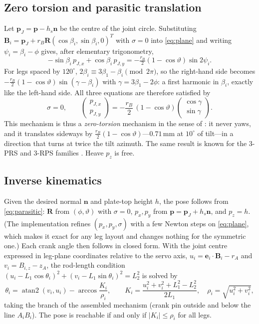 \documentclass[10pt,a4paper]{article}
\newcommand{\un}[1]{\,\mathrm{#1}}
\newcommand{\vect}[1]{\bm{#1}}
\newcommand{\hatn}{\vect{n}}
\begin{document}
\subsection{Zero torsion and parasitic translation}
Let $\vect p_J=\vect p-h_s\hatn$ be the centre of the joint circle. Substituting
$\vect B_i=\vect p_J+r_B\vect R(\cos\beta_i,\sin\beta_i,0)^T$ with $\sigma=0$ into
\eqref{eq:plane} and writing $\psi_i=\beta_i-\phi$ gives, after elementary trigonometry,
\begin{equation}
  -\sin\beta_i\,p_{J,x}+\cos\beta_i\,p_{J,y}=-\tfrac{r_B}{2}(1-\cos\vartheta)\sin 2\psi_i .
\end{equation}
For legs spaced by $120^\circ$, $2\beta_i\equiv 3\beta_1-\beta_i \pmod{2\pi}$, so the right-hand
side becomes $-\frac{r_B}{2}(1-\cos\vartheta)\sin(\gamma-\beta_i)$ with $\gamma=3\beta_1-2\phi$:
a first harmonic in $\beta_i$, exactly like the left-hand side. All three equations are
therefore satisfied by
\begin{equation}
  \sigma=0,\qquad
  \begin{pmatrix}p_{J,x}\\ p_{J,y}\end{pmatrix}
  =-\frac{r_B}{2}\,(1-\cos\vartheta)\begin{pmatrix}\cos\gamma\\ \sin\gamma\end{pmatrix}.
  \label{eq:parasitic}
\end{equation}
This mechanism is thus a \emph{zero-torsion} mechanism in the sense of
\citet{bonev2002advantages}: it never yaws, and it translates sideways by
$\frac{r_B}{2}(1-\cos\vartheta)$---$0.71\un{mm}$ at $10^\circ$ of tilt---in a direction that turns
at twice the tilt azimuth. The same result is known for the 3-PRS and 3-RPS families
\citep{carretero2000kinematic}. Heave $p_z$ is free.

\subsection{Inverse kinematics}
Given the desired normal $\hatn$ and plate-top height $h$, the pose follows from
\eqref{eq:parasitic}: $\vect R$ from $(\phi,\vartheta)$ with $\sigma=0$, $p_x,p_y$ from
$\vect p=\vect p_J+h_s\hatn$, and $p_z=h$. (The implementation refines $(p_x,p_y,\sigma)$ with a
few Newton steps on \eqref{eq:plane}, which makes it exact for any leg layout and changes
nothing for the symmetric one.) Each crank angle then follows in closed form. With the joint
centre expressed in leg-plane coordinates relative to the servo axis,
$u_i=\vect e_i\cdot\vect B_i-r_A$ and $v_i=B_{i,z}-z_A$, the rod-length condition
$(u_i-L_1\cos\theta_i)^2+(v_i-L_1\sin\theta_i)^2=L_2^2$ is solved by
\begin{equation}
  \theta_i=\operatorname{atan2}(v_i,u_i)-\arccos\frac{K_i}{\rho_i},\qquad
  K_i=\frac{u_i^2+v_i^2+L_1^2-L_2^2}{2L_1},\quad \rho_i=\sqrt{u_i^2+v_i^2},
\end{equation}
taking the branch of the assembled mechanism (crank pin outside and below the line
$A_iB_i$). The pose is reachable if and only if $|K_i|\le\rho_i$ for all legs.
\end{document}
